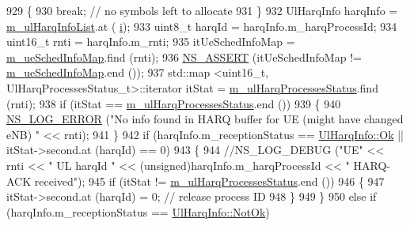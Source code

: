 \begin{DoxyCode}
929                         \{
930                                 \textcolor{keywordflow}{break};  \textcolor{comment}{// no symbols left to allocate}
931                         \}
932                         UlHarqInfo harqInfo = \hyperlink{classns3_1_1MmWaveFlexTtiPfMacScheduler_ad0251a6033c790a29ff25da7426ffd38}{m\_ulHarqInfoList}.at (
      \hyperlink{bernuolliDistribution_8m_a6f6ccfcf58b31cb6412107d9d5281426}{i});
933                         uint8\_t harqId = harqInfo.m\_harqProcessId;
934                         uint16\_t rnti = harqInfo.m\_rnti;
935                         itUeSchedInfoMap = \hyperlink{classns3_1_1MmWaveFlexTtiPfMacScheduler_a3b6dd19d8156d24c8d30cc562843b740}{m\_ueSchedInfoMap}.find (rnti);
936                         \hyperlink{assert_8h_a6dccdb0de9b252f60088ce281c49d052}{NS\_ASSERT} (itUeSchedInfoMap != \hyperlink{classns3_1_1MmWaveFlexTtiPfMacScheduler_a3b6dd19d8156d24c8d30cc562843b740}{m\_ueSchedInfoMap}.end ());
937                         std::map <uint16\_t, UlHarqProcessesStatus\_t>::iterator itStat = 
      \hyperlink{classns3_1_1MmWaveFlexTtiPfMacScheduler_aee0051900f7d928d25d577ad83983bf4}{m\_ulHarqProcessesStatus}.find (rnti);
938                         \textcolor{keywordflow}{if} (itStat == \hyperlink{classns3_1_1MmWaveFlexTtiPfMacScheduler_aee0051900f7d928d25d577ad83983bf4}{m\_ulHarqProcessesStatus}.end ())
939                         \{
940                                 \hyperlink{group__logging_ga0261a8db1d4ac5f79417d117634fd455}{NS\_LOG\_ERROR} (\textcolor{stringliteral}{"No info found in HARQ buffer for UE (might have
       changed eNB) "} << rnti);
941                         \}
942                         \textcolor{keywordflow}{if} (harqInfo.m\_receptionStatus == \hyperlink{structns3_1_1UlHarqInfo_af1ea9a1ce02c9b4a551ac978484a4336ad61a738c75abe251c05daa2461ecf308}{UlHarqInfo::Ok} || itStat->second.at
       (harqId) == 0)
943                         \{
944                                 \textcolor{comment}{//NS\_LOG\_DEBUG ("UE" << rnti << " UL harqId " <<
       (unsigned)harqInfo.m\_harqProcessId << " HARQ-ACK received");}
945                                 \textcolor{keywordflow}{if} (itStat != \hyperlink{classns3_1_1MmWaveFlexTtiPfMacScheduler_aee0051900f7d928d25d577ad83983bf4}{m\_ulHarqProcessesStatus}.end ())
946                                 \{
947                                         itStat->second.at (harqId) = 0;  \textcolor{comment}{// release process ID}
948                                 \}
949                         \}
950                         \textcolor{keywordflow}{else} \textcolor{keywordflow}{if} (harqInfo.m\_receptionStatus == \hyperlink{structns3_1_1UlHarqInfo_af1ea9a1ce02c9b4a551ac978484a4336a488db5f30de0c73647fed90c4a994a83}{UlHarqInfo::NotOk})

\end{DoxyCode}
